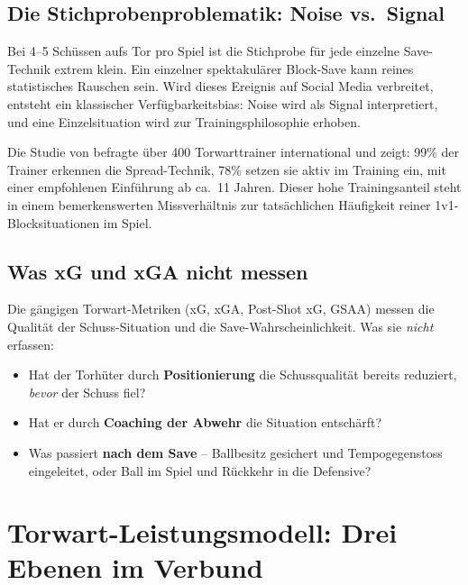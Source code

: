 \documentclass[12pt,a4paper]{article}
\begin{document}
\subsection{Die Stichprobenproblematik: Noise vs.\ Signal}
\label{sec:noise}

Bei 4--5 Sch\"ussen aufs Tor pro Spiel ist die Stichprobe f\"ur jede einzelne Save-Technik extrem klein. Ein einzelner spektakul\"arer Block-Save kann reines statistisches Rauschen sein. Wird dieses Ereignis auf Social Media verbreitet, entsteht ein klassischer Verf\"ugbarkeitsbias: Noise wird als Signal interpretiert, und eine Einzelsituation wird zur Trainingsphilosophie erhoben.

Die Studie von \citet{gramage2025} befragte \"uber 400 Torwarttrainer international und zeigt: 99\% der Trainer erkennen die Spread-Technik, 78\% setzen sie aktiv im Training ein, mit einer empfohlenen Einf\"uhrung ab ca.\ 11 Jahren. Dieser hohe Trainingsanteil steht in einem bemerkenswerten Missverh\"altnis zur tats\"achlichen H\"aufigkeit reiner 1v1-Blocksituationen im Spiel.


\subsection{Was xG und xGA nicht messen}
\label{sec:xg-limitationen}

Die g\"angigen Torwart-Metriken (xG, xGA, Post-Shot xG, GSAA) messen die Qualit\"at der Schuss-Situation und die Save-Wahrscheinlichkeit. Was sie \emph{nicht} erfassen:

\begin{itemize}[nosep]
  \item Hat der Torh\"uter durch \textbf{Positionierung} die Schussqualit\"at bereits reduziert, \emph{bevor} der Schuss fiel?
  \item Hat er durch \textbf{Coaching der Abwehr} die Situation entsch\"arft?
  \item Was passiert \textbf{nach dem Save} -- Ballbesitz gesichert und Tempogegenstoss eingeleitet, oder Ball im Spiel und R\"uckkehr in die Defensive?
\end{itemize}


\section{Torwart-Leistungsmodell: Drei Ebenen im Verbund}
\label{sec:leistungsmodell}
\end{document}
